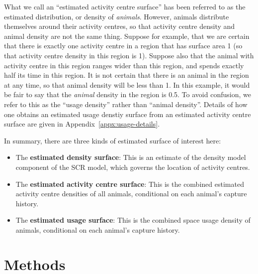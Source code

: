 \documentclass[10pt,a4paper]{article}
\begin{document}
What we call an ``estimated activity centre surface'' has been referred to as the estimated distribution, or density of \textit{animals}. However, animals distribute themselves around their activity centres, so that activity centre density and animal density are not the same thing. Suppose for example, that we are certain that there is exactly one activity centre in a region that has surface area 1 (so that activity centre density in this region is 1). Suppose also that the animal with activity centre in this region ranges wider than this region, and spends exactly half its time in this region. It is not certain that there is an animal in the region at any time, so that animal density will be less than 1. In this example, it would be fair to say that the \textit{animal} density in the region is 0.5. To avoid confusion, we refer to this as the ``usage density'' rather than ``animal density''. Details of how one obtains an estimated usage denstiy surface from an estimated activity centre surface are given in Appendix~\ref{appx:usage-details}.

In summary, there are three kinds of estimated surface of interest here: 
\begin{itemize}
\item The \textbf{estimated density surface}: This is an estimate of the density model component of the SCR model, which governs the location of activity centres.
\item The \textbf{estimated activity centre surface}: This is the combined estimated activity centre densities of all animals, conditional on each animal's capture history.
\item The \textbf{estimated usage surface}:  This is the combined space usage density of animals, conditional on each animal's capture history.
\end{itemize}



\section{Methods}
\end{document}
